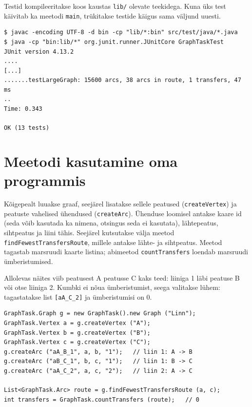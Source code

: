 \documentclass[12pt,a4paper,oneside]{report}
\newcommand{\code}[1]{\texttt{#1}}
\theoremstyle{definition}
\theoremstyle{plain}
\begin{document}
Testid kompileeritakse koos kaustas \code{lib/} olevate teekidega. Kuna
üks test käivitab ka meetodi \code{main}, trükitakse testide käigus sama
väljund uuesti.

\begin{lstlisting}[language={},numbers=none,caption={Testide kompileerimine ja käivitamine}]
$ javac -encoding UTF-8 -d bin -cp "lib/*:bin" src/test/java/*.java
$ java -cp "bin:lib/*" org.junit.runner.JUnitCore GraphTaskTest
JUnit version 4.13.2
....
[...]
.......testLargeGraph: 15600 arcs, 38 arcs in route, 1 transfers, 47 ms
..
Time: 0.343

OK (13 tests)
\end{lstlisting}

\section{Meetodi kasutamine oma programmis}

Kõigepealt luuakse graaf, seejärel lisatakse sellele peatused
(\code{createVertex}) ja peatuste vahelised ühendused (\code{createArc}).
Ühenduse loomisel antakse kaare id (seda võib kasutada ka nimena,
otsingus seda ei kasutata), lähtepeatus, sihtpeatus ja liini tähis. Seejärel kutsutakse välja meetod \code{findFewestTransfersRoute},
millele antakse lähte- ja sihtpeatus. Meetod tagastab marsruudi kaarte
listina; abimeetod \code{countTransfers} loendab marsruudi
ümberistumised.

Allolevas näites viib peatusest A peatusse C kaks teed: liiniga 1 läbi
peatuse B või otse liiniga 2. Kumbki ei nõua ümberistumist, seega valitakse
lühem: tagastatakse list \code{[aA\_C\_2]} ja ümberistumisi on 0.

\begin{lstlisting}[caption={Näide meetodi \code{findFewestTransfersRoute} kasutamisest},label={lst:kasutus}]
GraphTask.Graph g = new GraphTask().new Graph ("Linn");
GraphTask.Vertex a = g.createVertex ("A");
GraphTask.Vertex b = g.createVertex ("B");
GraphTask.Vertex c = g.createVertex ("C");
g.createArc ("aA_B_1", a, b, "1");   // liin 1: A -> B
g.createArc ("aB_C_1", b, c, "1");   // liin 1: B -> C
g.createArc ("aA_C_2", a, c, "2");   // liin 2: A -> C

List<GraphTask.Arc> route = g.findFewestTransfersRoute (a, c);
int transfers = GraphTask.countTransfers (route);   // 0
\end{lstlisting}

\end{document}
